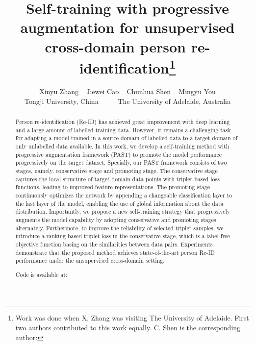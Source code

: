 \documentclass[10pt,twocolumn,letterpaper]{article}
\begin{document}
\title{Self-training with progressive augmentation  for  unsupervised cross-domain person re-identification\thanks{Work was done when X. Zhang  was visiting The University of Adelaide. 
First two authors contributed to this work equally. 
C. Shen is the corresponding author: 
}
}

\author{
Xinyu Zhang \quad  ~
Jiewei Cao \quad   ~
Chunhua Shen \quad ~
Mingyu You \quad \\
Tongji University, China 
~
~
~
The University of Adelaide, Australia\\
}

\maketitle
\ificcvfinal\thispagestyle{empty}\fi




\begin{abstract}
Person re-identification (Re-ID) has achieved great 
improvement with deep learning and a large amount of labelled training data. 
However, it remains a  challenging task for 
adapting
a model trained in
a source domain of labelled data to a  target domain of only unlabelled data available. 
In this work, we develop a self-training method with progressive augmentation framework (PAST) to promote the model performance progressively on the target dataset. 
Specially, our PAST framework consists of two stages, namely, conservative stage and promoting stage. The conservative stage captures the local structure of target-domain data points with triplet-based loss functions, leading to improved feature representations. 
The promoting stage continuously optimizes the network 
by appending a changeable classification layer to the last layer of the model,
enabling the use of  
global information about the data distribution. 
Importantly, we propose a new self-training strategy that progressively augments the model capability
by adopting conservative and promoting stages alternately. 
Furthermore, to improve the reliability of selected triplet samples, we introduce a ranking-based triplet loss in the conservative stage, which is a label-free objective function basing on the similarities between data pairs.
Experiments demonstrate that the proposed method achieves state-of-the-art person Re-ID performance under the unsupervised cross-domain setting.

Code is available at: \href{https://tinyurl.com/PASTReID}{{ }}
\end{abstract}
\end{document}

